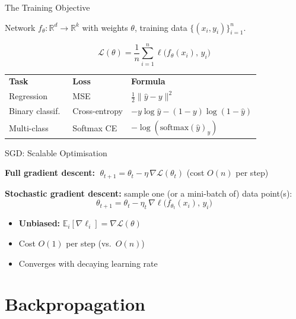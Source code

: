 \documentclass[aspectratio=169, professionalfonts]{beamer}
\def\R{\mathbb{R}}
\def\E{\mathbb{E}}
\begin{document}
\begin{frame}{The Training Objective}

Network $f_\theta:\R^d\to\R^k$ with weights $\theta$,
training data $\{(x_i, y_i)\}_{i=1}^n$.

$$\mathcal{L}(\theta)
  = \frac{1}{n}\sum_{i=1}^{n}\ell\!\bigl(f_\theta(x_i),\, y_i\bigr)$$

\bigskip

\begin{center}
\small
\begin{tabular}{lll}
\textbf{Task} & \textbf{Loss} & \textbf{Formula} \\[2pt]
Regression & MSE &
  $\frac{1}{2}\|\hat{y}-y\|^2$ \\[4pt]
Binary classif.\ & Cross-entropy &
  $-y\log\hat{y}-(1-y)\log(1-\hat{y})$ \\[4pt]
Multi-class & Softmax CE &
  $-\log(\text{softmax}(\hat{y})_y)$
\end{tabular}
\end{center}

\end{frame}

\begin{frame}{SGD: Scalable Optimisation}

\textbf{Full gradient descent:}
$\;\theta_{t+1} = \theta_t - \eta\,\nabla\mathcal{L}(\theta_t)$
\quad (cost $O(n)$ per step)

\bigskip

\textbf{Stochastic gradient descent:} sample one (or a mini-batch of)
data point(s):
$$\theta_{t+1} = \theta_t
  - \eta_t\,\nabla\ell\!\bigl(f_{\theta_t}(x_i),\, y_i\bigr)$$

\begin{itemize}
  \item \textbf{Unbiased:}
    $\E_i[\nabla\ell_i] = \nabla\mathcal{L}(\theta)$
  \item Cost $O(1)$ per step (vs.\ $O(n)$)
  \item Converges with decaying learning rate
\end{itemize}

\end{frame}

\section{Backpropagation}
\end{document}
